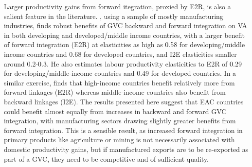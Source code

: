 \documentclass[a4paper]{article}
\begin{document}
Larger productivity gains from forward itegration, proxied by E2R, is also a salient feature in the literature. \citet{Kummritz20161}, using a sample of mostly manufacturing industries, finds robust benefits of GVC backward and forward integration on VA in both developing and developed/middle income countries, with a larger benefit of forward integration (E2R) at elasticities as high as 0.58 for developing/middle income countries and 0.68 for developed countries, and I2E elasticities smaller around 0.2-0.3. He also estimates labour productivity elasticities to E2R of 0.29 for developing/middle-income countries and 0.49 for developed countries. In a similar exercise, \citet{kummritz2015global} finds that high-income countries benefit relatively more from forward linkages (E2R) whereas middle-income countries also benefit from backward linkages (I2E). The results presented here suggest that EAC countries could benefit almost equally from increases in backward and forward GVC integration, with manufacturing sectors drawing slightly greater benefits from forward integration. 
This is a sensible result, as increased forward integration in primary products like agriculture or mining is not necessarily associated with domestic productivity gains, but if manufactured exports are to be re-exported as part of a GVC, they need to be competitive and of sufficient quality.  %
\end{document}
